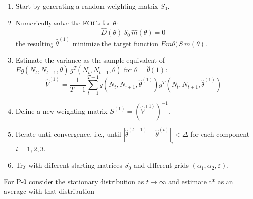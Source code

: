 \documentclass[11pt]{article}
\begin{document}
  \begin{enumerate}
        \item Start by generating a random weighting matrix $S_0$.
        \item Numerically solve the FOCs for $\theta$:
        \begin{equation}
            \hat D(\theta) \, S_0 \, \hat m (\theta) = 0
        \end{equation}
         the resulting $\hat \theta^{(1)}$ minimize the target function $E m\theta)  \, S \, m(\theta)$.
        \item Estimate the variance as the sample equivalent of $E g(N_t, N_{t+1}, \theta)  \, g^T(N_t, N_{t+1}, \theta)$ for $\theta = \hat \theta(1)$:
        \begin{equation}
            \hat V^{(1)}  = \frac{1}{T-1} \sum_{t=1}^{T-1} g(N_t, N_{t+1}, \hat \theta^{(1)}) g^T(N_t, N_{t+1}, \hat \theta^{(1)})
        \end{equation}
        \item Define a new weighting matrix $S^{(1)} = \left( \hat V^{(1)} \right)^{-1}$.
        \item Iterate until convergence, i.e., until $\left \vert \hat \theta^{(t+1)} - \hat \theta^{(t)} \right \vert_{i} < \Delta$ for each component $i=1,2,3$.
        \item Try with different starting matrices $S_0$ and different grids $(\alpha_1, \alpha_2, \varepsilon)$.
    \end{enumerate}







For P-0 consider the stationary distribution as $t \to \infty $ and estimate t* as an average with that distribution
\end{document}
